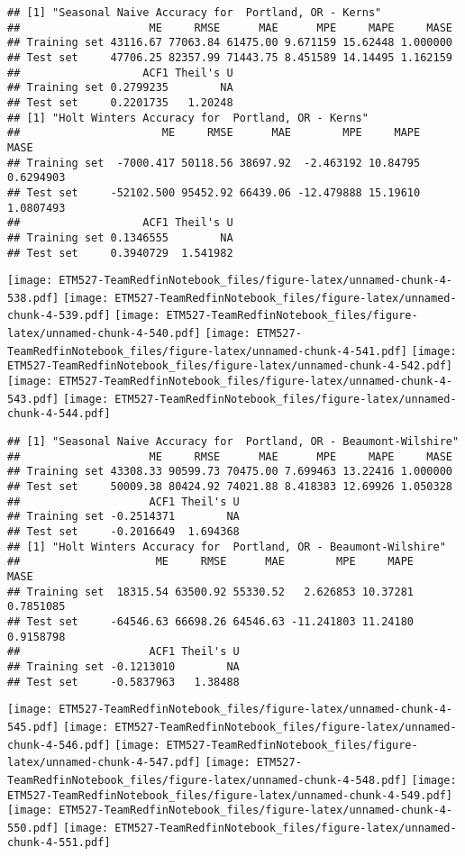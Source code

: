 \documentclass[]{article}
\begin{document}
\begin{verbatim}
## [1] "Seasonal Naive Accuracy for  Portland, OR - Kerns"
##                    ME     RMSE      MAE      MPE     MAPE     MASE
## Training set 43116.67 77063.84 61475.00 9.671159 15.62448 1.000000
## Test set     47706.25 82357.99 71443.75 8.451589 14.14495 1.162159
##                   ACF1 Theil's U
## Training set 0.2799235        NA
## Test set     0.2201735   1.20248
## [1] "Holt Winters Accuracy for  Portland, OR - Kerns"
##                      ME     RMSE      MAE        MPE     MAPE      MASE
## Training set  -7000.417 50118.56 38697.92  -2.463192 10.84795 0.6294903
## Test set     -52102.500 95452.92 66439.06 -12.479888 15.19610 1.0807493
##                   ACF1 Theil's U
## Training set 0.1346555        NA
## Test set     0.3940729  1.541982
\end{verbatim}

\texttt{[image: ETM527-TeamRedfinNotebook\_files/figure-latex/unnamed-chunk-4-538.pdf]}
\texttt{[image: ETM527-TeamRedfinNotebook\_files/figure-latex/unnamed-chunk-4-539.pdf]}
\texttt{[image: ETM527-TeamRedfinNotebook\_files/figure-latex/unnamed-chunk-4-540.pdf]}
\texttt{[image: ETM527-TeamRedfinNotebook\_files/figure-latex/unnamed-chunk-4-541.pdf]}
\texttt{[image: ETM527-TeamRedfinNotebook\_files/figure-latex/unnamed-chunk-4-542.pdf]}
\texttt{[image: ETM527-TeamRedfinNotebook\_files/figure-latex/unnamed-chunk-4-543.pdf]}
\texttt{[image: ETM527-TeamRedfinNotebook\_files/figure-latex/unnamed-chunk-4-544.pdf]}

\begin{verbatim}
## [1] "Seasonal Naive Accuracy for  Portland, OR - Beaumont-Wilshire"
##                    ME     RMSE      MAE      MPE     MAPE     MASE
## Training set 43308.33 90599.73 70475.00 7.699463 13.22416 1.000000
## Test set     50009.38 80424.92 74021.88 8.418383 12.69926 1.050328
##                    ACF1 Theil's U
## Training set -0.2514371        NA
## Test set     -0.2016649  1.694368
## [1] "Holt Winters Accuracy for  Portland, OR - Beaumont-Wilshire"
##                     ME     RMSE      MAE        MPE     MAPE      MASE
## Training set  18315.54 63500.92 55330.52   2.626853 10.37281 0.7851085
## Test set     -64546.63 66698.26 64546.63 -11.241803 11.24180 0.9158798
##                    ACF1 Theil's U
## Training set -0.1213010        NA
## Test set     -0.5837963   1.38488
\end{verbatim}

\texttt{[image: ETM527-TeamRedfinNotebook\_files/figure-latex/unnamed-chunk-4-545.pdf]}
\texttt{[image: ETM527-TeamRedfinNotebook\_files/figure-latex/unnamed-chunk-4-546.pdf]}
\texttt{[image: ETM527-TeamRedfinNotebook\_files/figure-latex/unnamed-chunk-4-547.pdf]}
\texttt{[image: ETM527-TeamRedfinNotebook\_files/figure-latex/unnamed-chunk-4-548.pdf]}
\texttt{[image: ETM527-TeamRedfinNotebook\_files/figure-latex/unnamed-chunk-4-549.pdf]}
\texttt{[image: ETM527-TeamRedfinNotebook\_files/figure-latex/unnamed-chunk-4-550.pdf]}
\texttt{[image: ETM527-TeamRedfinNotebook\_files/figure-latex/unnamed-chunk-4-551.pdf]}
\end{document}

